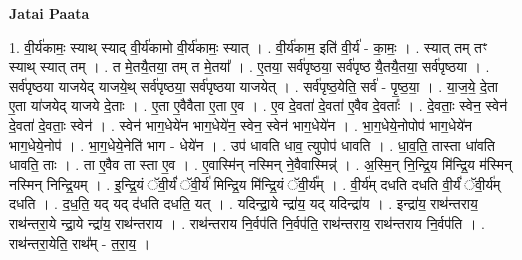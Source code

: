 \documentclass[17pt]{extarticle}
\begin{document}
\textbf{Jatai Paata} \newline

1. वी॒र्य॑कामः॒ स्याथ् स्याद् वी॒र्य॑कामो वी॒र्य॑कामः॒ स्यात् । . वी॒र्य॑काम॒ इति॑ वी॒र्य॑ - का॒मः॒ । . स्यात् तम् तꣳ स्याथ् स्यात् तम् । . त मे॒तयै॒तया॒ तम् त मे॒तया᳚ । . ए॒तया॒ सर्व॑पृष्ठया॒ सर्व॑पृष्ठ यै॒तयै॒तया॒ सर्व॑पृष्ठया । . सर्व॑पृष्ठया याजयेद् याजये॒थ् सर्व॑पृष्ठया॒ सर्व॑पृष्ठया याजयेत् । . सर्व॑पृष्ठ॒येति॒ सर्व॑ - पृ॒ष्ठ॒या॒ । . या॒ज॒ये॒ दे॒ता ए॒ता या॑जयेद् याजये दे॒ताः । . ए॒ता ए॒वैवैता ए॒ता ए॒व । . ए॒व दे॒वता॑ दे॒वता॑ ए॒वैव दे॒वताः᳚ । . दे॒वताः॒ स्वेन॒ स्वेन॑ दे॒वता॑ दे॒वताः॒ स्वेन॑ । . स्वेन॑ भाग॒धेये॑न भाग॒धेये॑न॒ स्वेन॒ स्वेन॑ भाग॒धेये॑न । . भा॒ग॒धेये॒नोपोप॑ भाग॒धेये॑न भाग॒धेये॒नोप॑ । . भा॒ग॒धेये॒नेति॑ भाग - धेये॑न । . उप॑ धावति धाव॒ त्युपोप॑ धावति । . धा॒व॒ति॒ तास्ता धा॑वति धावति॒ ताः । . ता ए॒वैव ता स्ता ए॒व । . ए॒वास्मि॑न् नस्मिन् ने॒वैवास्मिन्न्॑ । . अ॒स्मि॒न् नि॒न्द्रि॒य मि॑न्द्रि॒य म॑स्मिन् नस्मिन् निन्द्रि॒यम् । . इ॒न्द्रि॒यं ॅवी॒र्यं॑ ॅवी॒र्य॑ मिन्द्रि॒य मि॑न्द्रि॒यं ॅवी॒र्य᳚म् । . वी॒र्य॑म् दधति दधति वी॒र्यं॑ ॅवी॒र्य॑म् दधति । . द॒ध॒ति॒ यद् यद् द॑धति दधति॒ यत् । . यदिन्द्रा॒ये न्द्रा॑य॒ यद् यदिन्द्रा॑य । . इन्द्रा॑य॒ राथ॑न्तराय॒ राथ॑न्तरा॒ये न्द्रा॒ये न्द्रा॑य॒ राथ॑न्तराय । . राथ॑न्तराय नि॒र्वप॑ति नि॒र्वप॑ति॒ राथ॑न्तराय॒ राथ॑न्तराय नि॒र्वप॑ति । . राथ॑न्तरा॒येति॒ राथ᳚म् - त॒रा॒य॒ । \newline
\end{document}
